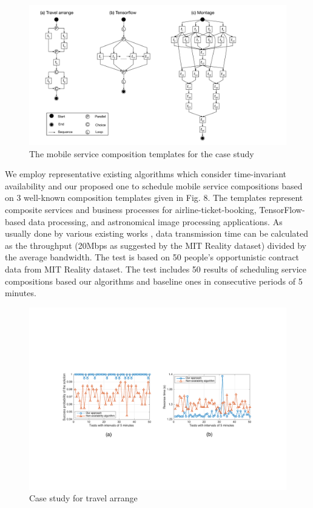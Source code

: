 \documentclass[journal]{IEEEtran}
\begin{document}
\begin{figure}[!t]
\centering
\includegraphics[width=5in]{./img/DAG.pdf}
\caption{The mobile service composition templates for the case study}
\label{DAG}
\end{figure}

We employ representative existing algorithms \cite{Deng2017} \cite{sadiq2015service} which consider time-invariant availability and our proposed one to schedule mobile service compositions based on 3 well-known composition templates given in Fig. 8. 
The templates represent composite services and business processes for airline-ticket-booking, TensorFlow-based data processing, and astronomical image processing applications. As usually done by various existing works \cite{Meena2016Cost, Rodriguez2014Deadline}, data transmission time can be calculated as the throughput (20Mbps as suggested by the MIT Reality dataset) divided by the average bandwidth. 
The test is based on 50 people’s opportunistic contract data from MIT Reality dataset. The test includes 50 results of scheduling service compositions based our algorithms and baseline ones in consecutive periods of 5 minutes. 

\begin{figure}[!t]
\centering
\includegraphics[width=6in]{./img/Task-6.pdf}
\caption{Case study for travel arrange}
\label{Task-6}
\end{figure}
\end{document}
